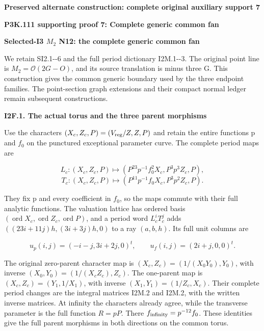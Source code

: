 



\par\bigskip\noindent\textbf{Preserved alternate construction: complete original auxiliary support 7}\par
\par\bigskip\noindent\textbf{P3K.111 supporting proof 7: Complete generic common fan}\par\nobreak
\par

\medskip\noindent\textbf{Selected-I3 \(M_{2}\) N12: the complete generic common fan}

\par\nobreak

We retain SI2.1-\/-6 and the full period dictionary I2M.1-\/-3.
The original point line is \(M_{2}=\mathcal O(2G-O)\), and its source
translation is minus three G. This construction gives the
common generic boundary used by the three endpoint families.
The point-section graph extensions and their compact normal
ledger remain subsequent constructions.

\par

\medskip\noindent\textbf{I2F.1. The actual torus and the three parent morphisms}

\par\nobreak

Use the characters \((X_c,Z_c,P)=(V_{\rm reg}/Z,Z,P)\) and retain
the entire functions p and \(f_{0}\) on the punctured exceptional
parameter curve. The complete period maps are

\[
 L_c:(X_c,Z_c,P)\mapsto
 (P^{23}p^{-1}f_0^2X_c,P^3p^3Z_c,P),
\]
\[
 T_c:(X_c,Z_c,P)\mapsto
 (P^{11}p^{-1}f_0X_c,P^3p^2Z_c,P).
 \tag{I2F.1}
\]

They fix p and every coefficient in \(f_{0}\), so the maps commute
with their full analytic functions. The valuation lattice
has ordered basis \((\operatorname{ord} X_c,\operatorname{ord} Z_c,\operatorname{ord} P)\), and a period word
\(L_c^i T_c^j\) adds \(((23i+11j)h,(3i+3j)h,0)\) to a ray \((a,b,h)\).
Its full unit columns are

\[
 u_p(i,j)=(-i-j,3i+2j,0)^t,\qquad
 u_f(i,j)=(2i+j,0,0)^t.
 \tag{I2F.2}
\]

The original zero-parent character map is
\((X_c,Z_c)=(1/(X_{0}Y_{0}),Y_{0})\), with inverse
\((X_{0},Y_{0})=(1/(X_cZ_c),Z_c)\). The one-parent map is
\((X_c,Z_c)=(Y_{1},1/X_{1})\), with inverse
\((X_{1},Y_{1})=(1/Z_c,X_c)\). Their complete period changes
are the integral matrices I2M.2 and I2M.2, with the
written inverse matrices. At infinity the characters
already agree, while the transverse parameter is
the full function \(R=pP\). There \(f_{\rm infinity}=p^{-12} f_{0}\).
These identities give the full parent morphisms in
both directions on the common torus.

